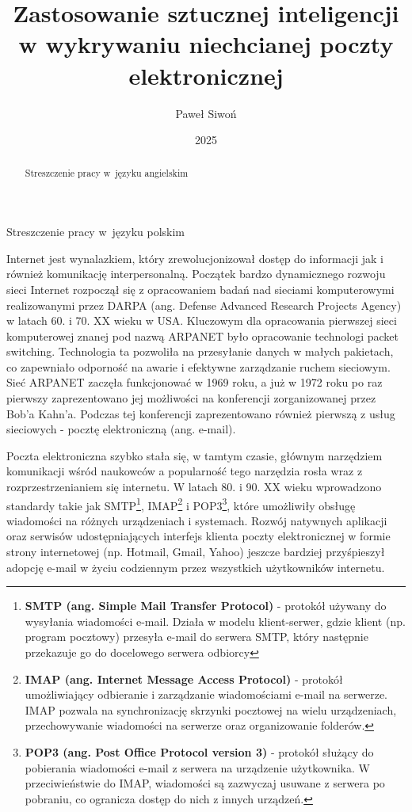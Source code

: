 \documentclass[skorowidz,skroty]{dyplomWEZUT}
\author{Paweł Siwoń}
\title{Zastosowanie sztucznej inteligencji w wykrywaniu niechcianej poczty elektronicznej}
\date{2025}
\begin{document}
\begin{streszczenie}
Streszczenie pracy w~języku polskim
\end{streszczenie}

\begin{abstract}
Streszczenie pracy w~języku angielskim
\end{abstract}

\maketitle


\begin{wprowadzenie}
Internet jest wynalazkiem, który zrewolucjonizował dostęp do informacji jak i również komunikację interpersonalną. Początek bardzo dynamicznego rozwoju sieci Internet rozpoczął się z opracowaniem badań nad sieciami komputerowymi realizowanymi przez DARPA (ang. Defense Advanced Research Projects Agency) w latach 60. i 70. XX wieku w USA. Kluczowym dla opracowania pierwszej sieci komputerowej znanej pod nazwą ARPANET było opracowanie technologi packet switching. Technologia ta pozwoliła na przesyłanie danych w małych pakietach, co zapewniało odporność na awarie i efektywne zarządzanie ruchem sieciowym. Sieć ARPANET zaczęła funkcjonować w 1969 roku, a już w 1972 roku po raz pierwszy zaprezentowano jej możliwości na konferencji zorganizowanej przez Bob'a Kahn'a. Podczas tej konferencji zaprezentowano również pierwszą z usług sieciowych - pocztę elektroniczną (ang. e-mail)\cite{Int_hist}.

Poczta elektroniczna szybko stała się, w tamtym czasie, głównym narzędziem komunikacji wśród naukowców a popularność tego narzędzia rosła wraz z rozprzestrzenianiem się internetu. W latach 80. i 90. XX wieku wprowadzono standardy takie jak SMTP\footnote{\textbf{SMTP (ang. Simple Mail Transfer Protocol)} - protokół używany do wysyłania wiadomości e-mail. Działa w modelu klient-serwer, gdzie klient (np. program pocztowy) przesyła e-mail do serwera SMTP, który następnie przekazuje go do docelowego serwera odbiorcy}, IMAP\footnote{\textbf{IMAP (ang. Internet Message Access Protocol)} - protokół umożliwiający odbieranie i zarządzanie wiadomościami e-mail na serwerze. IMAP pozwala na synchronizację skrzynki pocztowej na wielu urządzeniach, przechowywanie wiadomości na serwerze oraz organizowanie folderów.} i POP3\footnote{\textbf{POP3 (ang. Post Office Protocol version 3)} - protokół służący do pobierania wiadomości e-mail z serwera na urządzenie użytkownika. W przeciwieństwie do IMAP, wiadomości są zazwyczaj usuwane z serwera po pobraniu, co ogranicza dostęp do nich z innych urządzeń.}, które umożliwiły obsługę wiadomości na różnych urządzeniach i systemach. Rozwój natywnych aplikacji oraz serwisów udostępniających interfejs klienta poczty elektronicznej w formie strony internetowej (np. Hotmail, Gmail, Yahoo) jeszcze bardziej przyśpieszył adopcję e-mail w życiu codziennym przez wszystkich użytkowników internetu.


\end{wprowadzenie}
\end{document}
